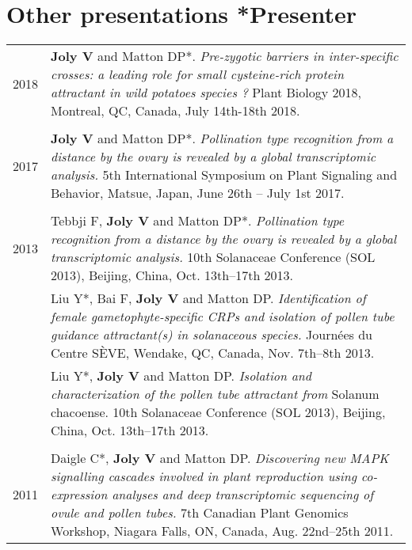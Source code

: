 \documentclass[letterpaper,10pt]{article}
\begin{document}
\bigskip
\bigskip

\section{Other presentations \hfill \small{*Presenter}}
\begin{tabular}{r|p{15.1cm}}

2018

& \textbf{Joly V} and Matton DP*.
  \emph{Pre-zygotic barriers in inter-specific crosses: a leading role for small
  cysteine-rich protein attractant in wild potatoes species ?}
  Plant Biology 2018, Montreal, QC, Canada, July 14th-18th 2018.
  \\

\multicolumn{2}{c}{} \\

2017

& \textbf{Joly V} and Matton DP*.
  \emph{Pollination type recognition from a distance by the ovary is revealed
  by a global transcriptomic analysis.}
  5th International Symposium on Plant Signaling and Behavior, Matsue, Japan,
  June 26th -- July 1st 2017.
  \\

\multicolumn{2}{c}{} \\

2013

& Tebbji F, \textbf{Joly V} and Matton DP*. \emph{Pollination type recognition
  from a distance by the ovary is revealed by a global transcriptomic analysis.}
  10th Solanaceae Conference (SOL 2013), Beijing, China, Oct. 13th--17th 2013.
  \vspace{1.5mm} \\

& Liu Y*, Bai F, \textbf{Joly V} and Matton DP.
  \emph{Identification of female gametophyte-specific CRPs and isolation of
  pollen tube guidance attractant(s) in solanaceous species.}
  Journées du Centre SÈVE, Wendake, QC, Canada, Nov. 7th--8th 2013.
  \vspace{1.5mm} \\

& Liu Y*, \textbf{Joly V} and Matton DP.
  \emph{Isolation and characterization of the pollen tube attractant from}
  Solanum chacoense. 10th Solanaceae Conference (SOL 2013), Beijing, China,
  Oct. 13th--17th 2013.
  \vspace{1.5mm} \\

\multicolumn{2}{c}{} \\

2011

& Daigle C*, \textbf{Joly V} and Matton DP.
  \emph{Discovering new MAPK signalling cascades involved in plant reproduction
  using co-expression analyses and deep transcriptomic sequencing of ovule
  and pollen tubes.}
  7th Canadian Plant Genomics Workshop, Niagara Falls, ON, Canada,
  Aug. 22nd--25th 2011.
  \\

\end{tabular}
\end{document}
